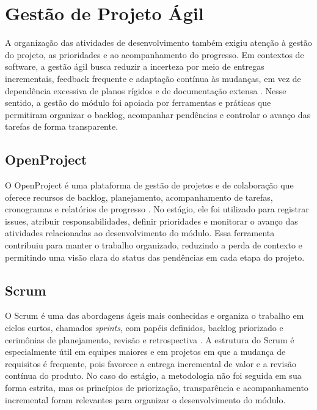\section{Gestão de Projeto Ágil}
\label{sec:gestao-projeto-agil}

A organização das atividades de desenvolvimento também exigiu atenção à gestão do projeto,
as prioridades e ao acompanhamento do progresso. Em contextos de software, a gestão ágil busca
reduzir a incerteza por meio de entregas incrementais, feedback frequente e adaptação contínua
às mudanças, em vez de dependência excessiva de planos rígidos e de documentação extensa
\cite{cohn2009}. Nesse sentido, a gestão do módulo foi apoiada por ferramentas e práticas que
permitiram organizar o backlog, acompanhar pendências e controlar o avanço das tarefas de forma
transparente.

\subsection{OpenProject}
\label{subsec:openproject}

O OpenProject é uma plataforma de gestão de projetos e de colaboração que oferece recursos de
backlog, planejamento, acompanhamento de tarefas, cronogramas e relatórios de progresso
\cite{openproject2026}. No estágio, ele foi utilizado para registrar issues, atribuir
responsabilidades, definir prioridades e monitorar o avanço das atividades relacionadas ao
desenvolvimento do módulo. Essa ferramenta contribuiu para manter o trabalho organizado,
reduzindo a perda de contexto e permitindo uma visão clara do status das pendências em cada
etapa do projeto.

\subsection{Scrum}
\label{subsec:scrum}

O Scrum é uma das abordagens ágeis mais conhecidas e organiza o trabalho em ciclos curtos,
chamados \textit{sprints}, com papéis definidos, backlog priorizado e cerimônias de
planejamento, revisão e retrospectiva \cite{cohn2009}. A estrutura do Scrum é especialmente útil
em equipes maiores e em projetos em que a mudança de requisitos é frequente, pois favorece a
entrega incremental de valor e a revisão contínua do produto. No caso do estágio, a metodologia
não foi seguida em sua forma estrita, mas os princípios de priorização, transparência e
acompanhamento incremental foram relevantes para organizar o desenvolvimento do módulo.

